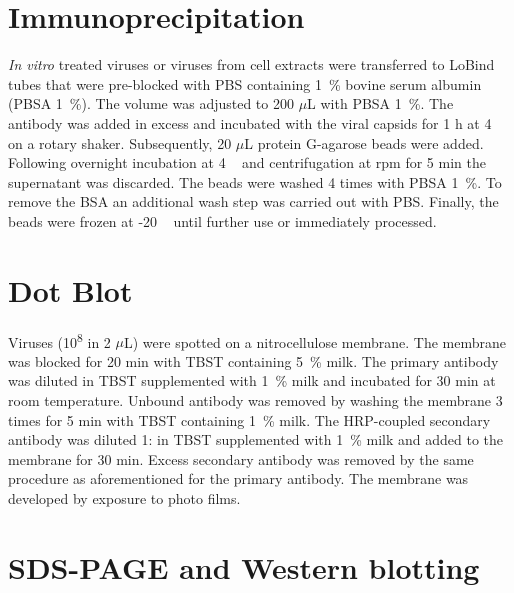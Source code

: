 \section{Immunoprecipitation}
\textit{In vitro} treated viruses or viruses from cell extracts were transferred to LoBind tubes that were pre-blocked with PBS containing 1~\% bovine serum albumin (PBSA 1~\%). The volume was adjusted to 200 $\mu$L with PBSA 1~\%. The antibody was added in excess and incubated with the viral capsids for 1 h at 4 \textcelsius~ on a rotary shaker. Subsequently, 20 $\mu$L protein G-agarose beads were added. Following overnight incubation at 4 \textcelsius~ and centrifugation at  rpm for 5 min the supernatant was discarded. The beads were washed 4 times with PBSA 1~\%. To remove the BSA an additional wash step was carried out with PBS. Finally, the beads were frozen at -20 \textcelsius~ until further use or immediately processed. 


\section{Dot Blot}
Viruses (10\textsuperscript{8} in 2 $\mu$L) were spotted on a nitrocellulose membrane. The membrane was blocked for 20 min with TBST containing 5~\% milk. The primary antibody was diluted in TBST supplemented with 1~\% milk and incubated for 30 min at room temperature. Unbound antibody was removed by washing the membrane 3 times for 5 min with TBST containing 1~\% milk. The HRP-coupled secondary antibody was diluted 1: in TBST supplemented with 1~\% milk and added to the membrane for 30 min. Excess secondary antibody was removed by the same procedure as aforementioned for the primary antibody. The membrane was developed by exposure to photo films.    


\section{SDS-PAGE and Western blotting}

